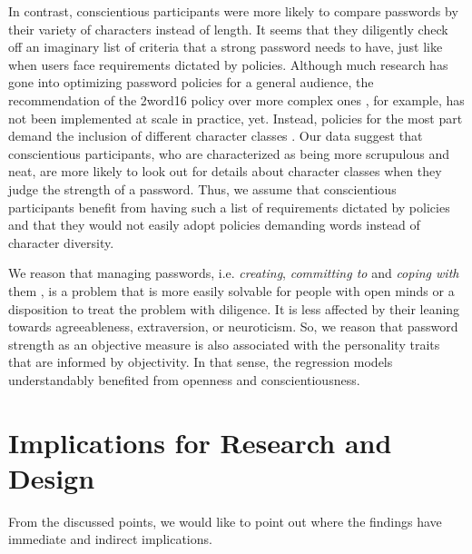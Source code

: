 In contrast, conscientious participants were more likely to compare passwords by their variety of characters instead of length. It seems that they diligently check off an imaginary list of criteria that a strong password needs to have, just like when users face requirements dictated by policies.  Although much research has gone into optimizing password policies for a general audience, the recommendation of the 2word16 policy over more complex ones \cite{Shay2016DesigningPasswordPolicies}, for example, has not been implemented at scale in practice, yet. Instead, policies for the most part demand the inclusion of different character classes \cite{Wang2015EmperorsPolicies}. Our data suggest that conscientious participants, who are characterized as being more scrupulous and neat, are more likely to look out for details about character classes when they judge the strength of a password. Thus, we assume that conscientious participants benefit from having such a list of requirements dictated by policies and that they would not easily adopt policies demanding words instead of character diversity.

We reason that managing passwords, i.e. \textit{creating}, \textit{committing to} and \textit{coping with} them \cite{Stobert2014PasswordLifeCycle}, is a problem that is more easily solvable for people with open minds or a disposition to treat the problem with diligence. It is less affected by their leaning towards agreeableness, extraversion, or neuroticism. So, we reason that password strength as an objective measure is also associated with the personality traits that are informed by objectivity. In that sense, the regression models understandably benefited from openness and conscientiousness.




\section{Implications for Research and Design} \label{sec:implications}
From the discussed points, we would like to point out where the findings have immediate and indirect implications. 

